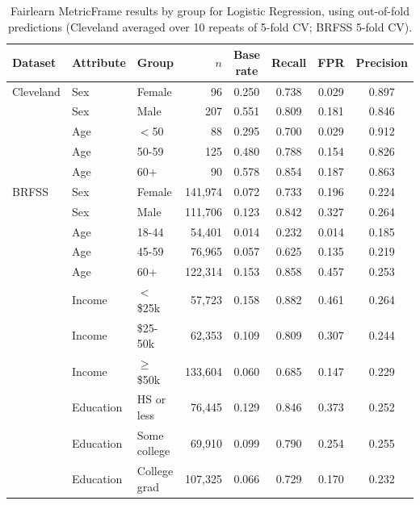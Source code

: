 \begin{table}[h]
\caption{Fairlearn MetricFrame results by group for Logistic Regression, using out-of-fold predictions (Cleveland averaged over 10 repeats of 5-fold CV; BRFSS 5-fold CV).}
\label{tab:fair}
\small\setlength\tabcolsep{4pt}
\begin{tabular}{lllrcccc}
\toprule
Dataset & Attribute & Group & $n$ & Base rate & Recall & FPR & Precision\\
\midrule
Cleveland & Sex & Female & 96 & 0.250 & 0.738 & 0.029 & 0.897\\
 & Sex & Male & 207 & 0.551 & 0.809 & 0.181 & 0.846\\
 & Age & $<$50 & 88 & 0.295 & 0.700 & 0.029 & 0.912\\
 & Age & 50-59 & 125 & 0.480 & 0.788 & 0.154 & 0.826\\
 & Age & 60+ & 90 & 0.578 & 0.854 & 0.187 & 0.863\\
\midrule
BRFSS & Sex & Female & 141,974 & 0.072 & 0.733 & 0.196 & 0.224\\
 & Sex & Male & 111,706 & 0.123 & 0.842 & 0.327 & 0.264\\
 & Age & 18-44 & 54,401 & 0.014 & 0.232 & 0.014 & 0.185\\
 & Age & 45-59 & 76,965 & 0.057 & 0.625 & 0.135 & 0.219\\
 & Age & 60+ & 122,314 & 0.153 & 0.858 & 0.457 & 0.253\\
 & Income & $<$\$25k & 57,723 & 0.158 & 0.882 & 0.461 & 0.264\\
 & Income & \$25-50k & 62,353 & 0.109 & 0.809 & 0.307 & 0.244\\
 & Income & $\geq$\$50k & 133,604 & 0.060 & 0.685 & 0.147 & 0.229\\
 & Education & HS or less & 76,445 & 0.129 & 0.846 & 0.373 & 0.252\\
 & Education & Some college & 69,910 & 0.099 & 0.790 & 0.254 & 0.255\\
 & Education & College grad & 107,325 & 0.066 & 0.729 & 0.170 & 0.232\\
\bottomrule
\end{tabular}
\end{table}